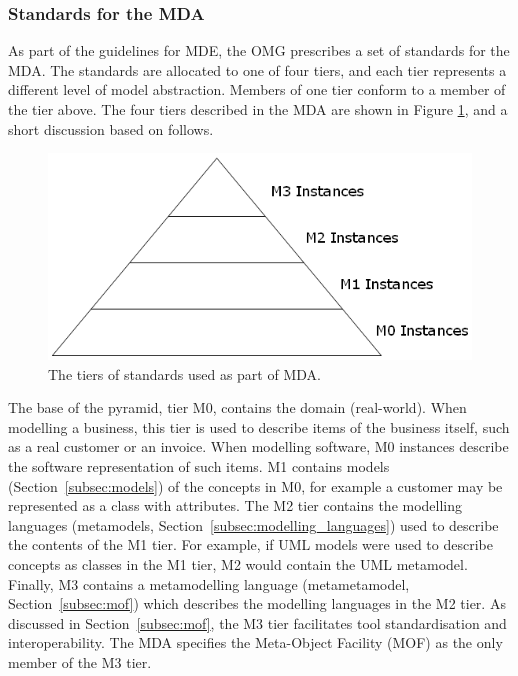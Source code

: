\subsubsection{Standards for the MDA}
As part of the guidelines for MDE, the OMG prescribes a set of standards for the MDA. The standards are allocated to one of four tiers, and each tier represents a different level of model abstraction. Members of one tier conform to a member of the tier above. The four tiers described in the MDA are shown in Figure \ref{fig:mda-pyramid}, and a short discussion based on \cite[Section 8.2]{kleppe03mda} follows.

\begin{figure}[htbp]
  \begin{center}
    \leavevmode
    \includegraphics[scale=0.5]{2.Background/images/mda-pyramid.png}
  \end{center}
  \caption{The tiers of standards used as part of MDA.}
  \label{fig:mda-pyramid}
\end{figure}

The base of the pyramid, tier M0, contains the domain (real-world). When modelling a business, this tier is used to describe items of the business itself, such as a real customer or an invoice. When modelling software, M0 instances describe the software representation of such items. M1 contains models (Section~\ref{subsec:models}) of the concepts in M0, for example a customer may be represented as a class with attributes. The M2 tier contains the modelling languages (metamodels, Section~\ref{subsec:modelling_languages}) used to describe the contents of the M1 tier. For example, if UML \cite{uml212} models were used to describe concepts as classes in the M1 tier, M2 would contain the UML metamodel. Finally, M3 contains a metamodelling language (metametamodel, Section~\ref{subsec:mof}) which describes the modelling languages in the M2 tier. As discussed in Section~\ref{subsec:mof}, the M3 tier facilitates tool standardisation and interoperability. The MDA specifies the Meta-Object Facility (MOF) \cite{mof} as the only member of the M3 tier.

